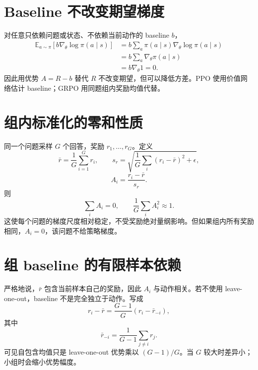 \documentclass[UTF8,12pt,a4paper,fontset=none]{ctexart}
\numberwithin{equation}{section}
\newcommand{\E}{\mathbb{E}}
\begin{document}
\section{Baseline 不改变期望梯度}
对任意只依赖问题或状态、不依赖当前动作的 baseline $b$，
\begin{align}
 \E_{a\sim\pi}[b\nabla_\theta\log\pi(a\mid s)]
 &=b\sum_a\pi(a\mid s)\nabla_\theta\log\pi(a\mid s)\\
 &=b\sum_a\nabla_\theta\pi(a\mid s)\\
 &=b\nabla_\theta1=0.
\end{align}
因此用优势 $A=R-b$ 替代 $R$ 不改变期望，但可以降低方差。PPO 使用价值网络估计 baseline；GRPO 用同题组内奖励均值代替。

\section{组内标准化的零和性质}
同一个问题采样 $G$ 个回答，奖励 $r_1,\ldots,r_G$。定义
\begin{equation}
 \bar r=\frac1G\sum_{i=1}^{G}r_i,
 \qquad
 s_r=\sqrt{\frac1G\sum_i(r_i-\bar r)^2+\epsilon},
\end{equation}
\begin{equation}
 A_i=\frac{r_i-\bar r}{s_r}.
\end{equation}
则
\begin{equation}
 \sum_iA_i=0,
 \qquad
 \frac1G\sum_iA_i^2\approx1.
\end{equation}
这使每个问题的梯度尺度相对稳定，不受奖励绝对量纲影响。但如果组内所有奖励相同，$A_i=0$，该问题不给策略梯度。

\section{组 baseline 的有限样本依赖}
严格地说，$\bar r$ 包含当前样本自己的奖励，因此 $A_i$ 与动作相关。若不使用 leave-one-out，baseline 不是完全独立于动作。写成
\begin{equation}
 r_i-\bar r
 =\frac{G-1}{G}\left(r_i-\bar r_{-i}\right),
\end{equation}
其中
\begin{equation}
 \bar r_{-i}=\frac1{G-1}\sum_{j\ne i}r_j.
\end{equation}
可见自包含均值只是 leave-one-out 优势乘以 $(G-1)/G$。当 $G$ 较大时差异小；小组时会缩小优势幅度。
\end{document}
